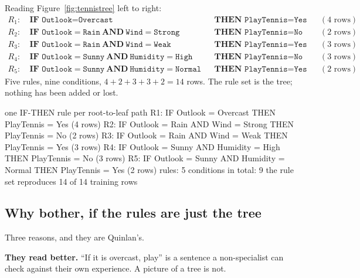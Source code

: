\documentclass[11pt]{article}
\begin{document}
\begin{worked}
Reading Figure~\ref{fig:tennistree} left to right:
\begin{align*}
  R_1:\ &\textbf{IF } \texttt{Outlook} = \texttt{Overcast}
    &&\textbf{THEN } \texttt{PlayTennis} = \texttt{Yes} && (4\text{ rows})\\
  R_2:\ &\textbf{IF } \texttt{Outlook} = \texttt{Rain}
    \ \textbf{AND}\ \texttt{Wind} = \texttt{Strong}
    &&\textbf{THEN } \texttt{PlayTennis} = \texttt{No} && (2\text{ rows})\\
  R_3:\ &\textbf{IF } \texttt{Outlook} = \texttt{Rain}
    \ \textbf{AND}\ \texttt{Wind} = \texttt{Weak}
    &&\textbf{THEN } \texttt{PlayTennis} = \texttt{Yes} && (3\text{ rows})\\
  R_4:\ &\textbf{IF } \texttt{Outlook} = \texttt{Sunny}
    \ \textbf{AND}\ \texttt{Humidity} = \texttt{High}
    &&\textbf{THEN } \texttt{PlayTennis} = \texttt{No} && (3\text{ rows})\\
  R_5:\ &\textbf{IF } \texttt{Outlook} = \texttt{Sunny}
    \ \textbf{AND}\ \texttt{Humidity} = \texttt{Normal}
    &&\textbf{THEN } \texttt{PlayTennis} = \texttt{Yes} && (2\text{ rows})
\end{align*}
Five rules, nine conditions, $4+2+3+3+2 = 14$ rows. The rule set is the tree;
nothing has been added or lost.
\end{worked}

\begin{codeout}
one IF-THEN rule per root-to-leaf path
R1: IF Outlook = Overcast THEN PlayTennis = Yes      (4 rows)
R2: IF Outlook = Rain AND Wind = Strong THEN PlayTennis = No      (2 rows)
R3: IF Outlook = Rain AND Wind = Weak THEN PlayTennis = Yes      (3 rows)
R4: IF Outlook = Sunny AND Humidity = High THEN PlayTennis = No      (3 rows)
R5: IF Outlook = Sunny AND Humidity = Normal THEN PlayTennis = Yes      (2 rows)
rules: 5   conditions in total: 9
the rule set reproduces 14 of 14 training rows
\end{codeout}

\subsection{Why bother, if the rules are just the tree}

Three reasons, and they are Quinlan's.

\textbf{They read better.} ``If it is overcast, play'' is a sentence a
non-specialist can check against their own experience. A picture of a tree is
not.
\end{document}
